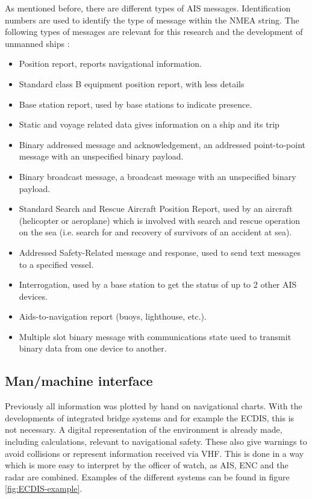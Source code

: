 \newpage
As mentioned before, there are different types of \ac{AIS} messages. Identification numbers are used to identify the type of message within the NMEA string. The following types of messages are relevant for this research and the development of unmanned ships \cite{USCG2018}:
\begin{itemize}
	\item Position report, reports navigational information.
	\item Standard class B equipment position report, with less details
	\item Base station report, used by base stations to indicate presence.
	\item Static and voyage related data gives information on a ship and its trip
	\item Binary addressed message and acknowledgement, an addressed point-to-point message with an unspecified binary payload.
	\item Binary broadcast message, a broadcast message with an unspecified binary payload.
	\item Standard Search and Rescue Aircraft Position Report, used by an aircraft (helicopter or aeroplane) which is involved with search and rescue operation on the sea (i.e. search for and recovery of survivors of an accident at sea).
	\item Addressed Safety-Related message and response, used to send text messages to a specified vessel.
	\item Interrogation, used by a base station to get the status of up to 2 other AIS devices.
	\item Aids-to-navigation report (buoys, lighthouse, etc.).
	\item Multiple slot binary message with communications state used to transmit binary data from one device to another.
\end{itemize}

\subsection{Man/machine interface}
Previously all information was plotted by hand on navigational charts. With the developments of integrated bridge systems and for example the \ac{ECDIS}, this is not necessary. A digital representation of the environment is already made, including calculations, relevant to navigational safety. These also give warnings to avoid collisions or represent information received via \ac{VHF}. This is done in a way which is more easy to interpret by the officer of watch, as \ac{AIS}, \ac{ENC} and the radar are combined. Examples of the different systems can be found in figure \ref{fig:ECDIS-example}.


